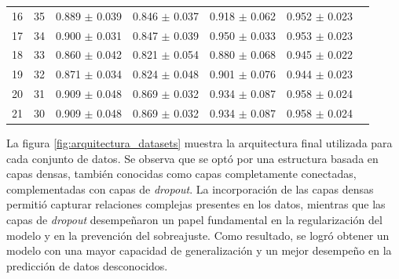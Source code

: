 \begin{table}[H]
\begin{tabular}{l c c c c c c}
      16 & 35 & 0.889 $\pm$ 0.039 & 0.846 $\pm$ 0.037	& 0.918 $\pm$ 0.062 & 0.952  $\pm$ 0.023\\
      17 & 34 & 0.900 $\pm$ 0.031 & 0.847 $\pm$ 0.039	& 0.950 $\pm$ 0.033 & 0.953  $\pm$ 0.023\\
      18 & 33 & 0.860 $\pm$ 0.042 & 0.821 $\pm$ 0.054	& 0.880 $\pm$ 0.068 & 0.945  $\pm$ 0.022\\
      19 & 32 & 0.871 $\pm$ 0.034 & 0.824 $\pm$ 0.048	& 0.901 $\pm$ 0.076 & 0.944  $\pm$ 0.023\\
      20 & 31 & 0.909 $\pm$ 0.048 & 0.869 $\pm$ 0.032	& 0.934 $\pm$ 0.087 & 0.958  $\pm$ 0.024\\
      21 & 30 & 0.909 $\pm$ 0.048 & 0.869 $\pm$ 0.032	& 0.934 $\pm$ 0.087 & 0.958  $\pm$ 0.024\\

		\bottomrule
		\hline
	\end{tabular}
	\label{tab:tablamodelos_1layers}
\end{table}


La figura \ref{fig:arquitectura_datasets} muestra la arquitectura final utilizada para cada conjunto de datos. 
Se observa que se optó por una estructura basada en capas densas, también conocidas como capas 
completamente conectadas, complementadas con capas de \emph{dropout}. La incorporación de las capas 
densas permitió capturar relaciones complejas presentes en los datos, mientras que las capas de 
\emph{dropout} desempeñaron un papel fundamental en la regularización del modelo y en la prevención 
del sobreajuste. Como resultado, se logró obtener un modelo con una mayor capacidad de generalización 
y un mejor desempeño en la predicción de datos desconocidos.


